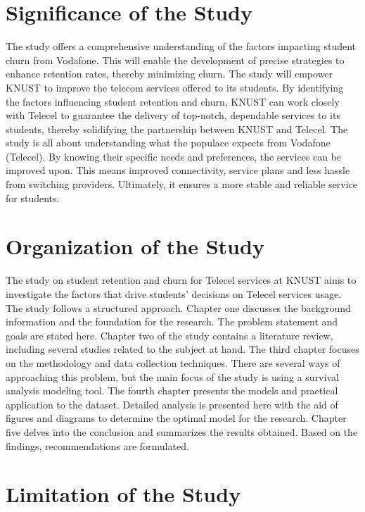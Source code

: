 \documentclass[doublespacing,12pt]{report}
\begin{document}
\section{Significance of the Study}

The study offers a comprehensive understanding of the factors impacting student churn from Vodafone. This will enable the development of precise strategies to enhance retention rates, thereby minimizing churn. The study will empower KNUST to improve the telecom services offered to its students. By identifying the factors influencing student retention and churn, KNUST can work closely with Telecel to guarantee the delivery of top-notch, dependable services to its students, thereby solidifying the partnership between KNUST and Telecel. The study is all about understanding what the populace expects from Vodafone (Telecel). By knowing their specific needs and preferences, the services can be improved upon. This means improved connectivity, service plans and less hassle from switching providers. Ultimately, it ensures a more stable and reliable service for students.

\section{Organization of the Study}

The study on student retention and churn for Telecel services at KNUST aims to investigate the factors that drive students' decisions on Telecel services usage. The study follows a structured approach. Chapter one discusses the background information and the foundation for the research. The problem statement and goals are stated here. Chapter two of the study contains a literature review, including several studies related to the subject at hand. The third chapter focuses on the methodology and data collection techniques. There are several ways of approaching this problem, but the main focus of the study is using a survival analysis modeling tool. The fourth chapter presents the models and practical application to the dataset. Detailed analysis is presented here with the aid of figures and diagrams to determine the optimal model for the research. Chapter five delves into the conclusion and summarizes the results obtained. Based on the findings, recommendations are formulated.

\section{Limitation of the Study}
\end{document}
